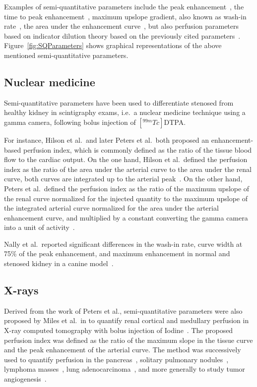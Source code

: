 Examples of semi-quantitative parameters include the peak enhancement~\cite{Norman:1978ji,Nally:1985te,Pettersson:1987ft,Erlemann:1989ib}, the time to peak enhancement~\cite{Norman:1978ji,Erlemann:1989ib,Dietrich:2012kw}, maximum upslope gradient, also known as wash-in rate~\cite{Nally:1985te,Erlemann:1989ib}, the area under the enhancement curve~\cite{Dietrich:2012kw}, but also perfusion parameters based on indicator dilution theory based on the previously cited parameters~\cite{Hilson:1978us,Peters:1987fa,Peters:1987vx,Miles:1991et,Miles:1991ei,Miles:1993cq,Blomley:1995vs,Koenig:1998ir}.
Figure~\ref{fig:SQParameters} shows graphical representations of the above mentioned semi-quantitative parameters. 

\subsection{Nuclear medicine}
\label{sec:SQNM}
Semi-quantitative parameters have been used to differentiate stenosed from healthy kidney in scintigraphy exams, i.e.~a nuclear medicine technique using a gamma camera, following bolus injection of $\left[^{99m}Tc\right]$DTPA.

For instance, Hilson et al.~and later Peters et al.~both proposed an enhancement-based perfusion index, which is commonly defined as the ratio of the tissue blood flow to the cardiac output. 
On the one hand, Hilson et al.~defined the perfusion index as the ratio of the area under the arterial curve to the area under the renal curve, both curves are integrated up to the arterial peak~\cite{Hilson:1978us}.
On the other hand, Peters et al.~defined the perfusion index as the ratio of the maximum upslope of the renal curve normalized for the injected quantity to the maximum upslope of the integrated arterial curve normalized for the area under the arterial enhancement curve, and multiplied by a constant converting the gamma camera into a unit of activity~\cite{Peters:1987fa,Peters:1987vx}. 

Nally et al.~reported significant differences in the wash-in rate, curve width at 75\% of the peak enhancement, and maximum enhancement in normal and stenosed kidney in a canine model~\cite{Nally:1985te}. 


\subsection{X-rays}
\label{sec:SQRadiography}
Derived from the work of Peters et al., semi-quantitative parameters were also proposed by Miles et al.~in \citeyear{Miles:1991et} to quantify renal cortical and medullary perfusion in X-ray computed tomography with bolus injection of Iodine~\cite{Miles:1991et,Miles:1991ei}. 
The proposed perfusion index was defined as the ratio of the maximum slope in the tissue curve and the peak enhancement of the arterial curve. 
The method was successively used to quantify perfusion in the pancreas~\cite{Miles:2014ea}, solitary pulmonary nodules~\cite{Zhang:1997bi}, lymphoma masses~\cite{Dugdale:1999co}, lung adenocarcinoma~\cite{Tateishi:2001fz}, and more generally to study tumor angiogenesis~\cite{Tateishi:2001fz,Miles:2002eu}.

